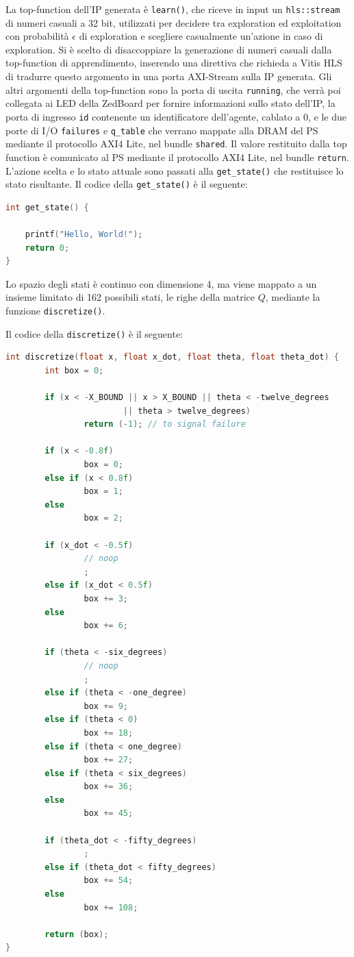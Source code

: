 \documentclass{article}
\begin{document}
La top-function dell'IP generata è \texttt{learn()}, che riceve in input un \texttt{hls::stream} di numeri casuali a 32 bit, utilizzati per decidere tra exploration ed exploitation con probabilità $\epsilon$ di exploration e scegliere casualmente un'azione in caso di exploration. 
Si è scelto di disaccoppiare la generazione di numeri casuali dalla top-function di apprendimento, inserendo una direttiva che richieda a Vitis HLS di tradurre questo argomento in una porta AXI-Stream sulla IP generata. 
Gli altri argomenti della top-function sono la porta di uscita \texttt{running}, che verrà poi collegata ai LED della ZedBoard per fornire informazioni sullo stato dell'IP, la porta di ingresso \texttt{id} contenente un identificatore dell'agente, cablato a 0, e le due porte di I/O \texttt{failures} e \texttt{q\_table} che verrano mappate alla DRAM del PS mediante il protocollo AXI4 Lite, nel bundle \texttt{shared}.
Il valore restituito dalla top function è comunicato al PS mediante il protocollo AXI4 Lite, nel bundle \texttt{return}.
L'azione scelta e lo stato attuale sono passati alla \texttt{get\_state()} che restituisce lo stato risultante. 
Il codice della \texttt{get\_state()} è il seguente:

\begin{lstlisting}[language=C++]
int get_state() {

	printf("Hello, World!");
	return 0;
}
\end{lstlisting}
Lo spazio degli stati è continuo con dimensione 4, ma viene mappato a un insieme limitato di 162 possibili stati, le righe della matrice $Q$, mediante la funzione \texttt{discretize()}. 

Il codice della \texttt{discretize()} è il seguente:
\begin{lstlisting}[language=C++]
int discretize(float x, float x_dot, float theta, float theta_dot) {
        int box = 0;

        if (x < -X_BOUND || x > X_BOUND || theta < -twelve_degrees
                        || theta > twelve_degrees)
                return (-1); // to signal failure

        if (x < -0.8f)
                box = 0;
        else if (x < 0.8f)
                box = 1;
        else
                box = 2;

        if (x_dot < -0.5f)
                // noop
                ;
        else if (x_dot < 0.5f)
                box += 3;
        else
                box += 6;

        if (theta < -six_degrees)
                // noop
                ;
        else if (theta < -one_degree)
                box += 9;
        else if (theta < 0)
                box += 18;
        else if (theta < one_degree)
                box += 27;
        else if (theta < six_degrees)
                box += 36;
        else
                box += 45;

        if (theta_dot < -fifty_degrees)
                ;
        else if (theta_dot < fifty_degrees)
                box += 54;
        else
                box += 108;

        return (box);
}
\end{lstlisting}
\end{document}

